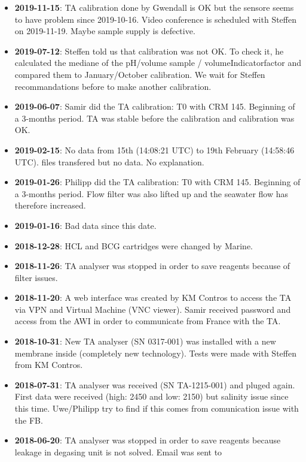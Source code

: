 \documentclass[
]{article}
\providecommand{\tightlist}{%
  \setlength{\itemsep}{0pt}\setlength{\parskip}{0pt}}
\begin{document}
\begin{itemize}
\tightlist
\item
  \textbf{2019-11-15}: TA calibration done by Gwendall is OK but the
  sensore seems to have problem since 2019-10-16. Video conference is
  scheduled with Steffen on 2019-11-19. Maybe sample supply is
  defective.
\item
  \textbf{2019-07-12}: Steffen told us that calibration was not OK. To
  check it, he calculated the mediane of the pH/volume sample /
  volumeIndicatorfactor and compared them to January/October
  calibration. We wait for Steffen recommandations before to make
  another calibration.
\item
  \textbf{2019-06-07}: Samir did the TA calibration: T0 with CRM 145.
  Beginning of a 3-months period. TA was stable before the calibration
  and calibration was OK.
\item
  \textbf{2019-02-15}: No data from 15th (14:08:21 UTC) to 19th February
  (14:58:46 UTC). files transfered but no data. No explanation.
\item
  \textbf{2019-01-26}: Philipp did the TA calibration: T0 with CRM 145.
  Beginning of a 3-months period. Flow filter was also lifted up and the
  seawater flow has therefore increased.
\item
  \textbf{2019-01-16}: Bad data since this date.
\item
  \textbf{2018-12-28}: HCL and BCG cartridges were changed by Marine.
\item
  \textbf{2018-11-26}: TA analyser was stopped in order to save reagents
  because of filter issues.
\item
  \textbf{2018-11-20}: A web interface was created by KM Contros to
  access the TA via VPN and Virtual Machine (VNC viewer). Samir received
  password and access from the AWI in order to communicate from France
  with the TA.
\item
  \textbf{2018-10-31}: New TA analyser (SN 0317-001) was installed with
  a new membrane inside (completely new technology). Tests were made
  with Steffen from KM Contros.
\item
  \textbf{2018-07-31}: TA analyser was received (SN TA-1215-001) and
  pluged again. First data were received (high: 2450 and low: 2150) but
  salinity issue since this time. Uwe/Philipp try to find if this comes
  from comunication issue with the FB.
\item
  \textbf{2018-06-20}: TA analyser was stopped in order to save reagents
  because leakage in degasing unit is not solved. Email was sent to

\end{itemize}
\end{document}
